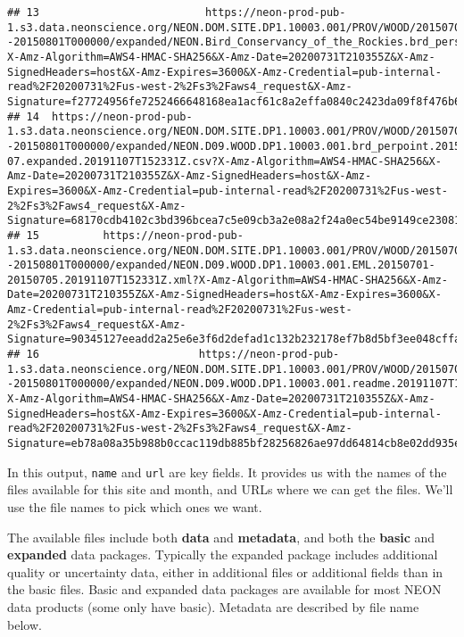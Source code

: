 \documentclass[]{book}
\begin{document}
\begin{verbatim}
## 13                          https://neon-prod-pub-1.s3.data.neonscience.org/NEON.DOM.SITE.DP1.10003.001/PROV/WOOD/20150701T000000--20150801T000000/expanded/NEON.Bird_Conservancy_of_the_Rockies.brd_personnel.csv?X-Amz-Algorithm=AWS4-HMAC-SHA256&X-Amz-Date=20200731T210355Z&X-Amz-SignedHeaders=host&X-Amz-Expires=3600&X-Amz-Credential=pub-internal-read%2F20200731%2Fus-west-2%2Fs3%2Faws4_request&X-Amz-Signature=f27724956fe7252466648168ea1acf61c8a2effa0840c2423da09f8f476b651a
## 14  https://neon-prod-pub-1.s3.data.neonscience.org/NEON.DOM.SITE.DP1.10003.001/PROV/WOOD/20150701T000000--20150801T000000/expanded/NEON.D09.WOOD.DP1.10003.001.brd_perpoint.2015-07.expanded.20191107T152331Z.csv?X-Amz-Algorithm=AWS4-HMAC-SHA256&X-Amz-Date=20200731T210355Z&X-Amz-SignedHeaders=host&X-Amz-Expires=3600&X-Amz-Credential=pub-internal-read%2F20200731%2Fus-west-2%2Fs3%2Faws4_request&X-Amz-Signature=68170cdb4102c3bd396bcea7c5e09cb3a2e08a2f24a0ec54be9149ce23081412
## 15          https://neon-prod-pub-1.s3.data.neonscience.org/NEON.DOM.SITE.DP1.10003.001/PROV/WOOD/20150701T000000--20150801T000000/expanded/NEON.D09.WOOD.DP1.10003.001.EML.20150701-20150705.20191107T152331Z.xml?X-Amz-Algorithm=AWS4-HMAC-SHA256&X-Amz-Date=20200731T210355Z&X-Amz-SignedHeaders=host&X-Amz-Expires=3600&X-Amz-Credential=pub-internal-read%2F20200731%2Fus-west-2%2Fs3%2Faws4_request&X-Amz-Signature=90345127eeadd2a25e6e3f6d2defad1c132b232178ef7b8d5bf3ee048cffab3a
## 16                         https://neon-prod-pub-1.s3.data.neonscience.org/NEON.DOM.SITE.DP1.10003.001/PROV/WOOD/20150701T000000--20150801T000000/expanded/NEON.D09.WOOD.DP1.10003.001.readme.20191107T152331Z.txt?X-Amz-Algorithm=AWS4-HMAC-SHA256&X-Amz-Date=20200731T210355Z&X-Amz-SignedHeaders=host&X-Amz-Expires=3600&X-Amz-Credential=pub-internal-read%2F20200731%2Fus-west-2%2Fs3%2Faws4_request&X-Amz-Signature=eb78a08a35b988b0ccac119db885bf28256826ae97dd64814cb8e02dd935ecd0
\end{verbatim}

In this output, \texttt{name} and \texttt{url} are key fields. It provides us with the names
of the files available for this site and month, and URLs where we can get the
files. We'll use the file names to pick which ones we want.

The available files include both \textbf{data} and \textbf{metadata}, and both the \textbf{basic}
and \textbf{expanded} data packages. Typically the expanded package includes additional
quality or uncertainty data, either in additional files or additional fields
than in the basic files. Basic and expanded data packages are available for
most NEON data products (some only have basic). Metadata are described by file
name below.
\end{document}
